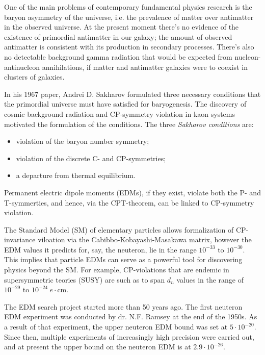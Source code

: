 
One of the main problems of contemporary fundamental physics research is the baryon asymmetry of the universe,
i.e. the prevalence of matter over antimatter in the observed universe. At the present moment there's 
no evidence of the existence of primordial antimatter in our galaxy; the amount of observed antimatter 
is consistent with its production in secondary processes. There's also no detectable background 
gamma radiation that would be expected from nucleon-antinucleon annihilations, if matter and antimatter
galaxies were to coexist in clusters of galaxies.~\cite{Trodden:Baryogenesis} 

In his 1967 paper, Andrei D. Sakharov formulated three necessary conditions that the primordial universe 
must have satisfied for baryogenesis. The discovery of cosmic background radiation and CP-symmetry violation 
in kaon systems~\cite{Fitch:Kaon-CP-violation-1964} motivated the formulation of the conditions. 
The three \emph{Sakharov conditions} are:
\begin{itemize}
	\item violation of the baryon number symmetry;
	\item violation of the discrete C- and CP-symmetries;
	\item a departure from thermal equilibrium.
\end{itemize}


Permanent electric dipole moments (EDMs), if they exist, violate both the P- and T-symmerties, and hence,
via the CPT-theorem, can be linked to CP-symmetry violation.

The Standard Model (SM) of elementary particles allows formalization of CP-invariance viloation
via the Cabibbo-Kobayashi-Masakawa matrix, however the EDM values it predicts for, say, the neuteron,
lie in the range $10^{-33}$ to $10^{-30}$\ecm.~\cite{Harris:Neutron2007}
This implies that particle EDMs can serve as a powerful tool
for discovering physics beyond the SM. For example, CP-violations that are endemic in
supersymmetric teories (SUSY) are such as to span $d_n$ values in the range of
$10^{-29}$ to $10^{-24}~e\cdot$cm.~\cite{JEDI:Website}

The EDM search project started more than 50 years ago. The first neuteron EDM experiment was conducted by
dr. N.F. Ramsey at the end of the 1950s. As a result of that experiment, the upper neuteron EDM bound was set
at $5\cdot 10^{-20}$\ecm.~\cite{Ramsey:Neutron1957} Since then, multiple experiments 
of increasingly high precision were carried out, and at present the upper bound on the neuteron EDM is at
$2.9\cdot 10^{-26}$\ecm.~\cite{Baker:nEDM:Main, Baker:nEDM:Reply}

